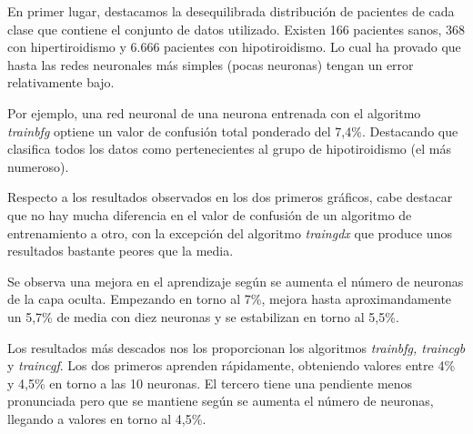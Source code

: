 \documentclass[a4paper,12pt,titlepage]{article}
\begin{document}

\restoregeometry
\newpage

En primer lugar, destacamos la desequilibrada distribución de pacientes de cada clase que contiene el conjunto de datos utilizado. Existen 166 pacientes sanos, 368 con hipertiroidismo y 6.666 pacientes con hipotiroidismo. Lo cual ha provado que hasta las redes neuronales más simples (pocas neuronas) tengan un error relativamente bajo. 

Por ejemplo, una red neuronal de una neurona entrenada con el algoritmo \textit{trainbfg} optiene un valor de confusión total ponderado del 7,4\%. Destacando que clasifica todos los datos como pertenecientes al grupo de hipotiroidismo (el más numeroso).

Respecto a los resultados observados en los dos primeros gráficos, cabe destacar que no hay mucha diferencia en el valor de confusión de un algoritmo de entrenamiento a otro, con la excepción del algoritmo \textit{traingdx} que produce unos resultados bastante peores que la media. 

Se observa una mejora en el aprendizaje según se aumenta el número de neuronas de la capa oculta. Empezando en torno al 7\%, mejora hasta aproximandamente un 5,7\% de media con diez neuronas y se estabilizan en torno al 5,5\%.

Los resultados más descados nos los proporcionan los algoritmos \textit{trainbfg, traincgb} y \textit{traincgf}. Los dos primeros aprenden rápidamente, obteniendo valores entre 4\% y 4,5\% en torno a las 10 neuronas. El tercero tiene una pendiente menos pronunciada pero que se mantiene según se aumenta el número de neuronas, llegando a valores en torno al 4,5\%.
\end{document}
